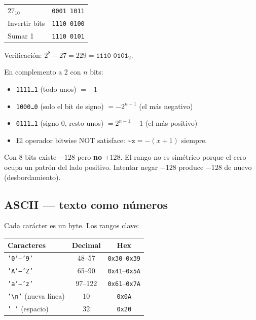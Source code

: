 \documentclass[12pt, oneside]{article}
\begin{document}
\begin{ejemplo}
\begin{center}
\begin{tabular}{ll}
  $27_{10}$       & \texttt{0001 1011} \\
  Invertir bits   & \texttt{1110 0100} \\
  Sumar 1         & \texttt{1110 0101} \\
\end{tabular}
\end{center}
Verificación: $2^8 - 27 = 229 = \texttt{1110 0101}_2$.\ \checkmark
\end{ejemplo}

\begin{recuerda}
  En complemento a 2 con $n$ bits:
  \begin{itemize}
    \item \texttt{1111\ldots1} (todo unos) $= -1$
    \item \texttt{1000\ldots0} (solo el bit de signo) $= -2^{n-1}$ (el más negativo)
    \item \texttt{0111\ldots1} (signo 0, resto unos) $= 2^{n-1} - 1$ (el más positivo)
    \item El operador bitwise NOT satisface: $\texttt{\textasciitilde{}x} = -(x+1)$ siempre.
  \end{itemize}
\end{recuerda}

\begin{advertencia}
  Con 8 bits existe $-128$ pero \textbf{no} $+128$.
  El rango no es simétrico porque el cero ocupa un patrón del lado positivo.
  Intentar negar $-128$ produce $-128$ de nuevo (desbordamiento).
\end{advertencia}

\subsection{ASCII — texto como números}

Cada carácter es un byte.  Los rangos clave:

\begin{center}
\begin{tabular}{lcc}
  \toprule
  \textbf{Caracteres} & \textbf{Decimal} & \textbf{Hex} \\
  \midrule
  \texttt{'0'–'9'} & 48–57  & \texttt{0x30}–\texttt{0x39} \\
  \texttt{'A'–'Z'} & 65–90  & \texttt{0x41}–\texttt{0x5A} \\
  \texttt{'a'–'z'} & 97–122 & \texttt{0x61}–\texttt{0x7A} \\
  \texttt{'\textbackslash n'} (nueva línea) & 10 & \texttt{0x0A} \\
  \texttt{' '} (espacio) & 32 & \texttt{0x20} \\
  \bottomrule
\end{tabular}
\end{center}
\end{document}
